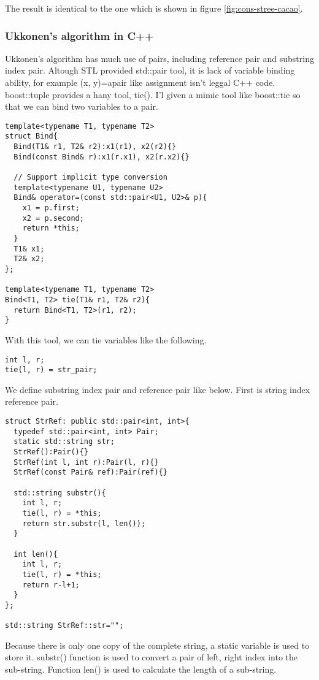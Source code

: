 \documentclass{article}
\begin{document}
The result is identical to the one which is shown in figure \ref{fig:cons-stree-cacao}.

\subsubsection*{Ukkonen's algorithm in C++}
\label{ukkonen-c++}
Ukkonen's algorithm has much use of pairs, including reference pair and 
substring index pair. Altough STL provided std::pair tool, it is lack of
variable binding ability, for example (x, y)=apair like assignment isn't
leggal C++ code. boost::tuple provides a hany tool, tie(). I'l given a mimic
tool like boost::tie so that we can bind two variables to a pair.

\lstset{language=C++}
\begin{lstlisting}
template<typename T1, typename T2>
struct Bind{
  Bind(T1& r1, T2& r2):x1(r1), x2(r2){}
  Bind(const Bind& r):x1(r.x1), x2(r.x2){}

  // Support implicit type conversion
  template<typename U1, typename U2>
  Bind& operator=(const std::pair<U1, U2>& p){
    x1 = p.first;
    x2 = p.second;
    return *this;
  }
  T1& x1;
  T2& x2;
};

template<typename T1, typename T2>
Bind<T1, T2> tie(T1& r1, T2& r2){ 
  return Bind<T1, T2>(r1, r2); 
}
\end{lstlisting}

With this tool, we can tie variables like the following.

\begin{lstlisting}
int l, r;
tie(l, r) = str_pair;
\end{lstlisting}

We define substring index pair and reference pair like below.
First is string index reference pair.

\begin{lstlisting}
struct StrRef: public std::pair<int, int>{
  typedef std::pair<int, int> Pair;
  static std::string str;
  StrRef():Pair(){}
  StrRef(int l, int r):Pair(l, r){}
  StrRef(const Pair& ref):Pair(ref){}

  std::string substr(){
    int l, r;
    tie(l, r) = *this;
    return str.substr(l, len());
  }

  int len(){ 
    int l, r;
    tie(l, r) = *this;
    return r-l+1; 
  }
};

std::string StrRef::str="";
\end{lstlisting}

Because there is only one copy of the complete string, a static variable
is used to store it. substr() function is used to convert a pair of left,
right index into the sub-string. Function len() is used to calculate the
length of a sub-string.
\end{document}
